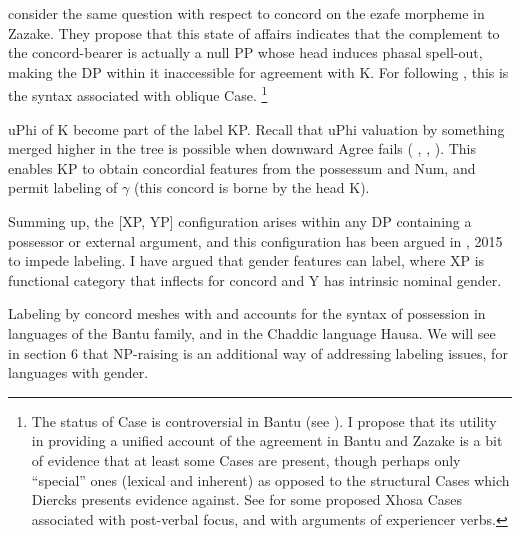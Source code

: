 \documentclass[output=paper
,modfonts
,nonflat]{langsci/langscibook}
\begin{document}
\citet{Toosarvandani_Van_Urk2014} consider the same question with respect to concord on the ezafe morpheme in Zazake. They propose that this state of affairs indicates that the complement to the concord-bearer is actually a null PP whose head induces phasal spell-out, making the DP within it inaccessible for agreement with K. For \citet{Toosarvandani_Van_Urk2014} following \citet{Rezac2008}, this is the syntax associated with oblique Case. \footnote{The status of Case is controversial in Bantu (see \citealt{Diercks2012}). I propose that its utility in providing a unified account of the agreement in Bantu and Zazake is a bit of evidence that at least some Cases are present, though perhaps only “special” ones (lexical and inherent) as opposed to the structural Cases which Diercks presents evidence against. See \citet{Carstens_Mletshe2015} for some proposed Xhosa Cases associated with post-verbal focus, and with arguments of experiencer verbs.}
\begin{figure}[!h]
	\begin{exe}
		\ex 
	\end{exe}
\end{figure}
uPhi of K become part of the label KP. Recall that uPhi valuation by something merged higher in the tree is possible when downward Agree fails ( \citealt{Bejar_Rezac2009}, \citealt{Carstens2016},  \citealt{Toosarvandani_Van_Urk2014}). This enables KP to obtain concordial features from the possessum and Num, and permit labeling of $\gamma$ (this concord is borne by the head K).

Summing up, the [XP, YP] configuration arises within any DP containing a possessor or external argument, and this configuration has been argued in \citealt{Chomsky2013}, 2015 to impede labeling. I have argued that gender features can label, where XP is functional category that inflects for concord and Y has intrinsic nominal gender. 

Labeling by concord meshes with and accounts for the syntax of possession in languages of the Bantu family, and in the Chaddic language Hausa. We will see in section 6 that NP-raising is an additional way of addressing labeling issues, for languages with gender. 
\end{document}
